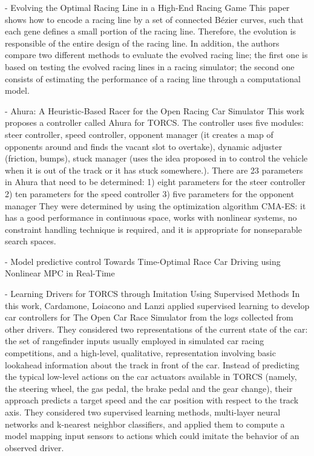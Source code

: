 - Evolving the Optimal Racing Line in a High-End Racing Game
This paper shows how to encode a racing line by a set of connected Bézier curves, such that each gene defines a small portion of the racing line. Therefore, the evolution is responsible of the entire design of the racing line. In addition, the authors compare two different methods to evaluate the evolved racing line; the first one is based on testing the evolved racing lines in a racing simulator; the second one consists of estimating the performance of a racing line through a computational model.
	
- Ahura: A Heuristic-Based Racer for the Open Racing Car Simulator
This work proposes a controller called Ahura for TORCS. The controller uses five modules: steer controller, speed controller, opponent manager (it creates a map of opponents around  and finds the vacant slot to overtake), dynamic adjuster (friction, bumps), stuck manager (uses the idea proposed in to control the vehicle when it is out of the track or it has stuck somewhere.).
There are 23 parameters in Ahura that need to be determined:
1) eight parameters for the steer controller 
2) ten parameters for the speed controller 
3) five parameters for the opponent manager
They were determined by using the optimization algorithm CMA-ES: it has a good performance in continuous space, works with nonlinear systems, no constraint handling technique is required, and it is appropriate for nonseparable search spaces.


- Model predictive control Towards Time-Optimal Race Car Driving using Nonlinear MPC in
Real-Time



- Learning Drivers for TORCS through Imitation Using Supervised Methods	
In this work, Cardamone, Loiacono and Lanzi applied supervised learning to develop car controllers for The Open Car Race Simulator from the logs collected from other drivers. 
They considered two representations of the current state of the car: the set of rangefinder inputs usually employed in simulated car racing competitions, and a high-level, qualitative, representation involving basic lookahead information about the track in front of the car. Instead of predicting the typical low-level actions on the car actuators available in TORCS (namely, the steering wheel, the gas pedal, the brake pedal and the gear change), their approach predicts a target speed and the car position with respect to the track axis.
They considered two supervised learning methods, multi-layer neural networks and k-nearest neighbor classifiers, and applied them to compute a model mapping input sensors to actions which could imitate the behavior of an observed driver.
